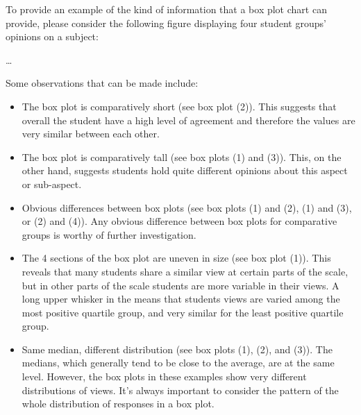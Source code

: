 \noindent To provide an example of the kind of information that a box plot chart can provide, please consider the following figure displaying four student groups' opinions on a subject:

\dots

Some observations that can be made include:
\begin{itemize}
    \item The box plot is comparatively short (see box plot  (2)). This suggests that overall the student have a high level of agreement and therefore the values are very similar between each other.
    \item The box plot is comparatively tall (see box plots (1) and (3)). This, on the other hand, suggests students hold quite different opinions about this aspect or sub-aspect.
    \item Obvious differences between box plots (see box plots (1) and (2), (1) and (3), or (2) and (4)). Any obvious difference between box plots for comparative groups is worthy of further investigation.
    \item The 4 sections of the box plot are uneven in size (see box plot (1)). This reveals that many students share a similar view at certain parts of the scale, but in other parts of the scale students are more variable in their views. A long upper whisker in the means that students views are varied among the most positive quartile group, and very similar for the least positive quartile group. 
    \item Same median, different distribution (see box plots (1), (2), and (3)). The medians, which generally tend to be close to the average, are at the same level. However, the box plots in these examples show very different distributions of views. It's always important to consider the pattern of the whole distribution of responses in a box plot.
\end{itemize}


